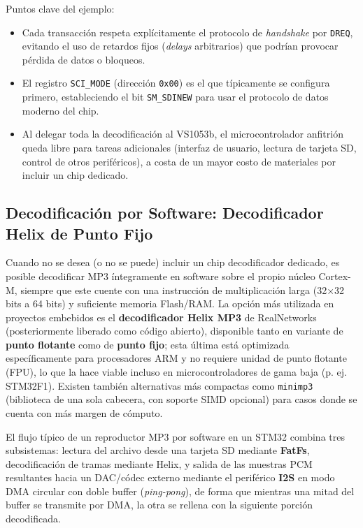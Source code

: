 \documentclass[pdflatex,sn-mathphys-num]{sn-jnl}%
\begin{document}
Puntos clave del ejemplo:
\begin{itemize}
    \item Cada transacción respeta explícitamente el protocolo de \textit{handshake} por \texttt{DREQ}, evitando el uso de retardos fijos (\textit{delays} arbitrarios) que podrían provocar pérdida de datos o bloqueos.
    \item El registro \texttt{SCI\_MODE} (dirección \texttt{0x00}) es el que típicamente se configura primero, estableciendo el bit \texttt{SM\_SDINEW} para usar el protocolo de datos moderno del chip.
    \item Al delegar toda la decodificación al VS1053b, el microcontrolador anfitrión queda libre para tareas adicionales (interfaz de usuario, lectura de tarjeta SD, control de otros periféricos), a costa de un mayor costo de materiales por incluir un chip dedicado.
\end{itemize}

\subsection{Decodificación por Software: Decodificador Helix de Punto Fijo}\label{sec:helix}
Cuando no se desea (o no se puede) incluir un chip decodificador dedicado, es posible decodificar MP3 íntegramente en software sobre el propio núcleo Cortex-M, siempre que este cuente con una instrucción de multiplicación larga (32×32 bits a 64 bits) y suficiente memoria Flash/RAM. La opción más utilizada en proyectos embebidos es el \textbf{decodificador Helix MP3} de RealNetworks (posteriormente liberado como código abierto), disponible tanto en variante de \textbf{punto flotante} como de \textbf{punto fijo}; esta última está optimizada específicamente para procesadores ARM y no requiere unidad de punto flotante (FPU), lo que la hace viable incluso en microcontroladores de gama baja (p. ej. STM32F1). Existen también alternativas más compactas como \texttt{minimp3} (biblioteca de una sola cabecera, con soporte SIMD opcional) para casos donde se cuenta con más margen de cómputo.

El flujo típico de un reproductor MP3 por software en un STM32 combina tres subsistemas: lectura del archivo desde una tarjeta SD mediante \textbf{FatFs}, decodificación de tramas mediante Helix, y salida de las muestras PCM resultantes hacia un DAC/códec externo mediante el periférico \textbf{I2S} en modo DMA circular con doble buffer (\textit{ping-pong}), de forma que mientras una mitad del buffer se transmite por DMA, la otra se rellena con la siguiente porción decodificada.
\end{document}
